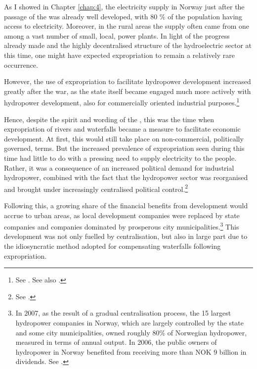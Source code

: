 As I showed in Chapter \ref{chap:4}, the electricity supply in Norway just after the passage of the \cite{wra40} was already well developed, with 80 \% of the population having access to electricity. Moreover, in the rural areas the supply often came from one among a vast number of small, local, power plants. In light of the progress already made and the highly decentralised structure of the hydroelectric sector at this time, one might have expected expropriation to remain a relatively rare occurrence.

However, the use of expropriation to facilitate hydropower development increased greatly after the war, as the state itself became engaged much more actively with hydropower development, also for commercially oriented industrial purposes.\footnote{See \cite[59-71]{thue96}. See also \cite{skjold06}.}

Hence, despite the spirit and wording of the \cite{wra40}, this was the time when expropriation of rivers and waterfalls became a measure to facilitate economic development. At first, this would still take place on non-commercial, politically governed, terms. But the increased prevalence of expropriation seen during this time had little to do with a pressing need to supply electricity to the people. Rather, it was a consequence of an increased political demand for industrial hydropower, combined with the fact that the hydropower sector was reorganised and brought under increasingly centralised political control.\footnote{See \cite[69-71]{thue96}.} %

Following this, a growing share of the financial benefits from development would accrue to urban areas, as local development companies were replaced by state companies and companies dominated by prosperous city municipalities.\footnote{In 2007, as the result of a gradual centralisation process, the 15 largest hydropower companies in Norway, which are largely controlled by the state and some city municipalities, owned roughly 80\% of Norwegian hydropower, measured in terms of annual output. In 2006, the public owners of hydropower in Norway benefited from receiving more than NOK 9 billion in dividends. See \cite[28]{otprp61}.} This development was not only fuelled by centralisation, but also in large part due to the idiosyncratic method adopted for compensating waterfalls following expropriation.

